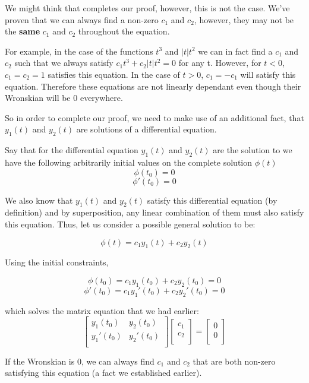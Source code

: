 \documentclass{report}
\begin{document}
We might think that completes our proof, however, this is not the case. We've proven that we can always find a non-zero $c_1$ and $c_2$, however, they may not be the \textbf{same} $c_1$ and $c_2$ throughout the equation. 

For example, in the case of the functions $t^3$ and $|t|t^2$ we can in fact find a $c_1$ and $c_2$ such that we always satisfy $c_1t^3+c_2|t|t^2=0$ for any t. However, for $t < 0$, $c_1=c_2=1$ satisfies this equation. In the case of $t>0$, $c_1=-c_1$ will satisfy this equation. Therefore these equations are not linearly dependant even though their Wronskian will be 0 everywhere.

So in order to complete our proof, we need to make use of an additional fact, that $y_1(t)$ and $y_2(t)$ are solutions of a differential equation. 

Say that for the differential equation $y_1(t)$ and $y_2(t)$ are the solution to we have the following arbitrarily initial values on the complete solution $\phi(t)$
$$\phi(t_0) = 0$$
$$\phi'(t_0) = 0$$


We also know that $y_1(t)$ and $y_2(t)$ satisfy this differential equation (by definition) and by superposition, any linear combination of them must also satisfy this equation. Thus, let us consider a possible  general solution to be:

$$\phi(t) = c_1y_1(t) +c_2y_2(t)$$

Using the initial constraints,

$$\phi(t_0) = c_1y_1(t_0) +c_2y_2(t_0) = 0$$
$$\phi'(t_0) = c_1y_1'(t_0) +c_2y_2'(t_0) = 0$$

which solves the matrix equation that we had earlier:
$$
\begin{bmatrix}
    y_1(t_0) & y_2(t_0) \\
    y_1'(t_0) & y_2'(t_0) \\
\end{bmatrix}
\begin{bmatrix}
    c_1 \\
    c_2 \\
\end{bmatrix}
=
\begin{bmatrix}
    0 \\
    0 \\
\end{bmatrix}
$$

If the Wronskian is 0, we can always find $c_1$ and $c_2$ that are both non-zero satisfying this equation (a fact we established earlier). 
\end{document}
